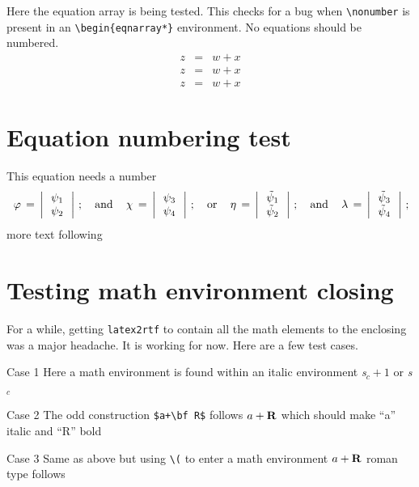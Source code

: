 ﻿\documentclass{article}
\begin{document}
Here the equation array is being tested.  This checks for a bug when 
\verb#\nonumber# is present in an \verb#\begin{eqnarray*}# environment.  
No equations should be numbered.
\begin{eqnarray*}
z & = & w + x  \\
z & = & w + x \nonumber\\
z & = & w + x  
\end{eqnarray*}

\section{Equation numbering test}
This equation needs a number 
\begin{equation}\label{ab3}
\,\varphi\,=\,\left|\,
\begin{array}{c}
\psi_1 \\
\psi_2
\end{array}\,\right|\,; \quad {\rm and} \quad
\,\chi\,=\,\left|\,
\begin{array}{c}
\psi_3 \\
\psi_4
\end{array}\,\right|\,; \quad {\rm or} \quad
\,\eta\,=\,\left|\,
\begin{array}{c}
\tilde{\psi}_1 \\
\tilde{\psi}_2
\end{array}\,\right|\,; \quad {\rm and} \quad
\,\lambda\,=\,\left|\,
\begin{array}{c}
\tilde{\psi}_3 \\
\tilde{\psi}_4
\end{array}\,\right|\,;
\end{equation}
more text following

\section{Testing math environment closing}

For a while, getting \texttt{latex2rtf} to contain all the math elements
to the enclosing was a major headache.  It is working for now.  Here are
a few test cases.

Case 1 Here a math environment is found within an italic environment
\textit{s$_c+1$} or {\it s$_c$}

Case 2 The odd construction \verb#$a+\bf R$# follows $a+\bf R$ which
should make ``a'' italic and ``R'' bold

Case 3 Same as above but using \verb#\(# to enter a math environment
\(a+\bf R\) roman type follows
\end{document}
